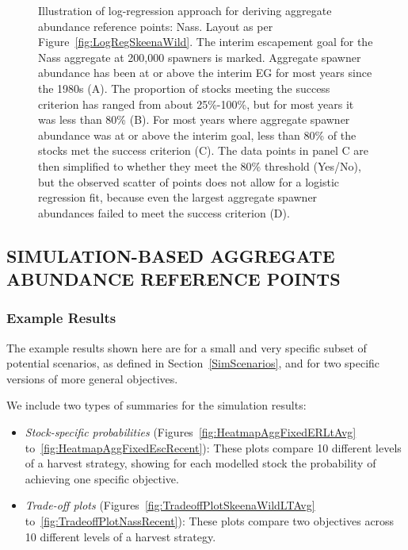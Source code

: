 \documentclass[french,11pt]{book}
\begin{document}
\begin{figure}[htb]

{\centering {} 

}

\caption{Illustration of log-regression approach for deriving aggregate abundance reference points: Nass. Layout as per Figure~\ref{fig:LogRegSkeenaWild}. The interim escapement goal for the Nass aggregate at 200,000 spawners is marked. Aggregate spawner abundance has been at or above the interim EG for most years since the 1980s (A). The proportion of stocks meeting the success criterion has ranged from about 25\%-100\%, but for most years it was less than 80\% (B). For most years where aggregate spawner abundance was at or above the interim goal, less than 80\% of the stocks met the success criterion (C). The data points in panel C are then simplified to whether they meet the 80\% threshold (Yes/No), but the observed scatter of points does not allow for a logistic regression fit, because even the largest aggregate spawner abundances failed to meet the success criterion (D).}\label{fig:LogRegNass}
\end{figure}
\clearpage

\subsection{SIMULATION-BASED AGGREGATE ABUNDANCE REFERENCE POINTS}\label{ProjBesdResults}

\subsubsection{Example Results}\label{example-results}

The example results shown here are for a small and very specific subset of potential scenarios, as defined in Section~\ref{SimScenarios}, and for two specific versions of more general objectives.

We include two types of summaries for the simulation results:
\begin{itemize}

\item
  \emph{Stock-specific probabilities} (Figures~\ref{fig:HeatmapAggFixedERLtAvg} to~\ref{fig:HeatmapAggFixedEscRecent}): These plots compare 10 different levels of a harvest strategy, showing for each modelled stock the probability of achieving one specific objective.
\item
  \emph{Trade-off plots} (Figures~\ref{fig:TradeoffPlotSkeenaWildLTAvg} to~\ref{fig:TradeoffPlotNassRecent}): These plots compare two objectives across 10 different levels of a harvest strategy.
\end{itemize}
\end{document}
